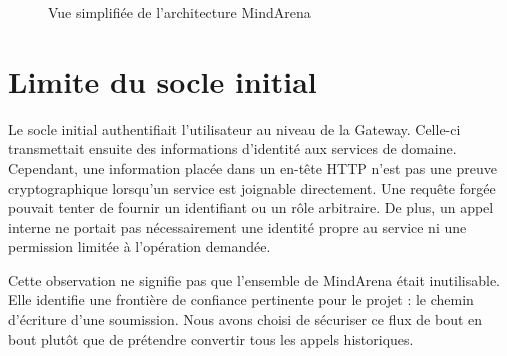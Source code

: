 \documentclass[12pt,a4paper,oneside]{report}
\begin{document}
\begin{figure}[H]
\centering
{}
\caption{Vue simplifiée de l'architecture MindArena}
\label{fig:mindarena-overview}
\end{figure}

\section{Limite du socle initial}
Le socle initial authentifiait l'utilisateur au niveau de la Gateway. Celle-ci
transmettait ensuite des informations d'identité aux services de domaine.
Cependant, une information placée dans un en-tête HTTP n'est pas une preuve
cryptographique lorsqu'un service est joignable directement. Une requête forgée
pouvait tenter de fournir un identifiant ou un rôle arbitraire. De plus, un
appel interne ne portait pas nécessairement une identité propre au service ni
une permission limitée à l'opération demandée.

Cette observation ne signifie pas que l'ensemble de MindArena était inutilisable.
Elle identifie une frontière de confiance pertinente pour le projet : le chemin
d'écriture d'une soumission. Nous avons choisi de sécuriser ce flux de bout en
bout plutôt que de prétendre convertir tous les appels historiques.
\end{document}
